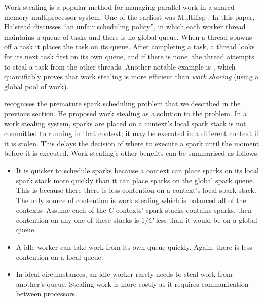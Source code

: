 
Work stealing is a popular method for managing parallel work in a shared
memory multiprocessor system.
One of the earliest was Multilisp \citep{halstead:1985:multilisp};
In this paper,
Halstead discusses ``an unfair scheduling policy'',
in which each worker thread maintains a queue of tasks
and there is no global queue.
When a thread spawns off a task it places the task on its queue.
After completing a task, a thread looks for its next task first
on its own queue, and if there is none,
the thread attempts to steal a task from the other threads.
Another notable example is
\citet{blumofe:1999:work-stealing},
which quantifiably proves that work stealing is more efficient than
\emph{work sharing}
(using a global pool of work).

\citet{wang:2006:hons} recognises the premature spark scheduling problem
that we described in the previous section.
He proposed work stealing as a solution to the problem.
In a work stealing system,
sparks are placed on a context's local spark stack
is not committed to running in that context;
it may be executed in a different context if it is stolen.
This delays the decision of where to execute a spark until the moment
before it is executed.
Work stealing's other benefits can be summarised as follows.

\begin{itemize}

    \item
    It is quicker to schedule sparks because
    a context can place sparks on its local spark stack more quickly
    than it can place sparks on the global spark queue.
    This is because there there is less contention on a context's
    local spark stack.
    The only source of contention is work stealing which is balanced all of
    the contexts.
    Assume each of the $C$ contexts' spark stacks contains sparks, then
    contention on any one of these stacks is $1/C$ less than it would be on
    a global queue.

    \item
    A idle worker can take work from its own queue quickly.
    Again, there is less contention on a local queue.

    \item
    In ideal circumstances,
    an idle worker rarely needs to steal work from another's queue.
    Stealing work is more costly as it requires communication between
    processors.

\end{itemize}

